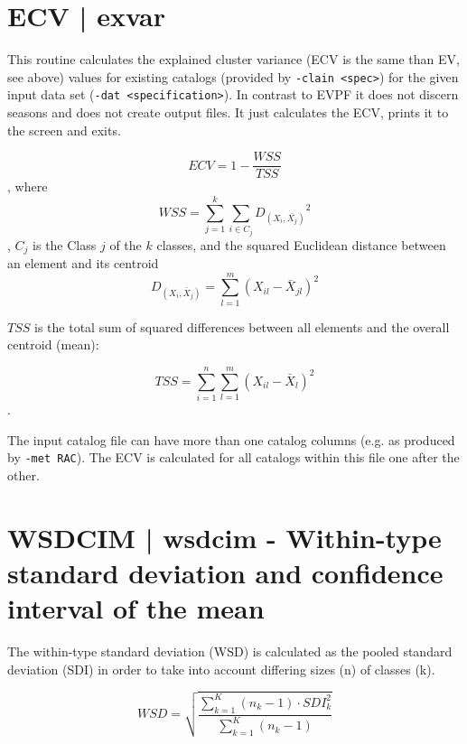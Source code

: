 \documentclass[12pt, oneside, a4paper, headsepline, plainheadsepline]{scrbook}
\begin{document}
\section{ECV | exvar}

This routine calculates the explained cluster variance (ECV is the same than EV, see above) values for existing catalogs
(provided by \verb+-clain <spec>+) for the given input data set (\verb+-dat <specification>+). 
In contrast to EVPF it does not discern seasons and does not create output files. It just calculates the ECV, 
prints it to the screen and exits.

\begin{equation}
ECV = 1 - \frac{WSS}{TSS}
\end{equation}
, where 
\begin{equation}
WSS = \sum^{k}_{j=1}{ \sum_{i \in C_j}{ {D_{(X_i,\bar{X_j})}}^2} }
\end{equation}
, $C_j$ is the Class $j$ of the $k$ classes, and the squared Euclidean distance between an element and its centroid
\begin{equation}
D_{(X_i,\bar{X}_j)} = \sum^{m}_{l=1}{ (X_{il} - \bar{X}_{jl})^2 }
\end{equation}

$TSS$ is the total sum of squared differences between all elements and the overall centroid (mean):

\begin{equation}
TSS = \sum^{n}_{i=1} \sum^{m}_{l=1} { (X_{il} - \bar{X}_l)^2}
\end{equation}.


The input catalog file can have more than one catalog columns (e.g. as produced by \verb+-met RAC+).
The ECV is calculated for all catalogs within this file one after the other.

\section{WSDCIM | wsdcim - Within-type standard deviation and confidence interval of the mean}

The within-type standard deviation (WSD) is calculated as the pooled standard deviation (SDI) in order to take into account differing sizes (n) of classes (k).



\begin{equation}
WSD = \sqrt{\frac{{\sum_{k=1}^K(n_k -1)\cdot SDI_k^2}}{\sum_{k=1}^K(n_k -1)}}
\end{equation}
\end{document}
